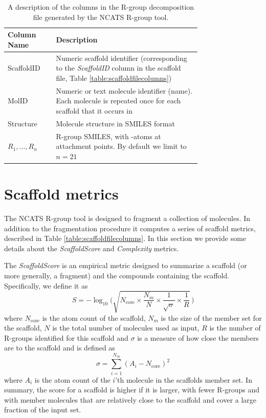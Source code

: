 \documentclass[11pt,letterpaper,biochem]{article}
\begin{document}
\begin{table}[h]
  \centering
    \caption{A description of the columns in the R-group decomposition
      file generated by the NCATS R-group tool.}
      \vspace{0.1in}
  \begin{tabular}[h]{lp{0.75\linewidth}}
    \hline
    \textbf{Column Name} & \textbf{Description} \\
    \hline
    ScaffoldID & Numeric scaffold identifier (corresponding to
  the {\it ScaffoldID} column in the scaffold file, Table \ref{table:scaffoldfilecolumns}) \\
  MolID & Numeric or text molecule identifier (name). Each molecule is
  repeated once for each scaffold that it occurs in \\
  Structure & Molecule structure in SMILES format \\
  $R_1, \ldots, R_n$ & R-group SMILES, with \*-atoms at attachment
  points. By default we limit to $n = 21$ \\
  \hline
  \end{tabular}
\end{table}


\newpage

\section{Scaffold metrics}
\label{sec:scaffold-metrics}

The NCATS R-group tool is designed to fragment a collection of
molecules. In addition to the fragmentation procedure it computes a
series of scaffold metrics, described in Table
\ref{table:scaffoldfilecolumns}. In this section we provide some
details about the \textit{ScaffoldScore} and \textit{Complexity}
metrics.

The \textit{ScaffoldScore} is an empirical metric designed to
summarize a scaffold (or more generally, a fragment) and the compounds
containing the scaffold. Specifically, we define it as  
\begin{equation}
  \label{eq:1}
  S = -\log_{10} \Bigg( \sqrt{ N_{\mathrm{core}} \times \frac{N_{m}}{N} \times
    \frac{1}{\sqrt{\sigma}} \times \frac{1}{R} }  \, \Bigg)
\end{equation}
where $N_{\mathrm{core}}$ is the atom count of the scaffold,
$N_{m}$ is the size of the member set for the scaffold,
$N$ is the total number of molecules used as input, $R$ is the number
of R-groups identified for this scaffold and $\sigma$ is a measure of
how close the members are to the scaffold and is defined as
\begin{equation}
  \label{eq:2}
  \sigma = \sum_{i=1}^{N_m} ( A_i - N_{\mathrm{core}} )^2
\end{equation}
where $A_i$ is the atom count of the $i$'th molecule in the scaffolds
member set.  In summary, the score for a scaffold is higher if it is
larger, with fewer R-groups and with member molecules that are
relatively close to the scaffold and cover a large fraction of the
input set.
\end{document}
